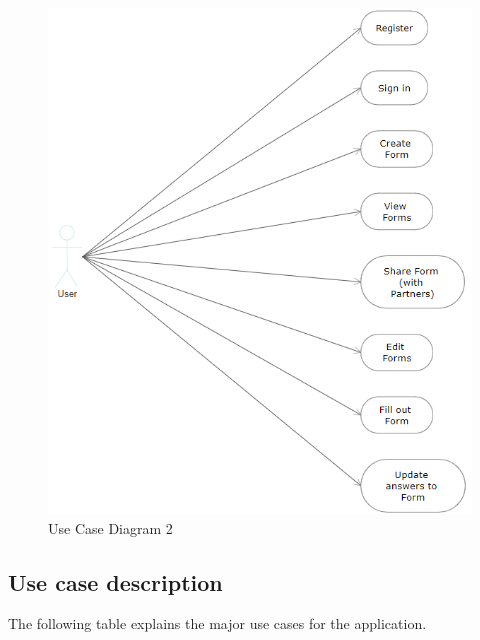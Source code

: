     \begin{figure}
        \center
        \includegraphics[scale=0.70]{../figures/UseCaseUser}
        \caption{Use Case Diagram 2}
    \end{figure}

    \subsection{Use case description}

        The following table explains the major use cases for the application.

